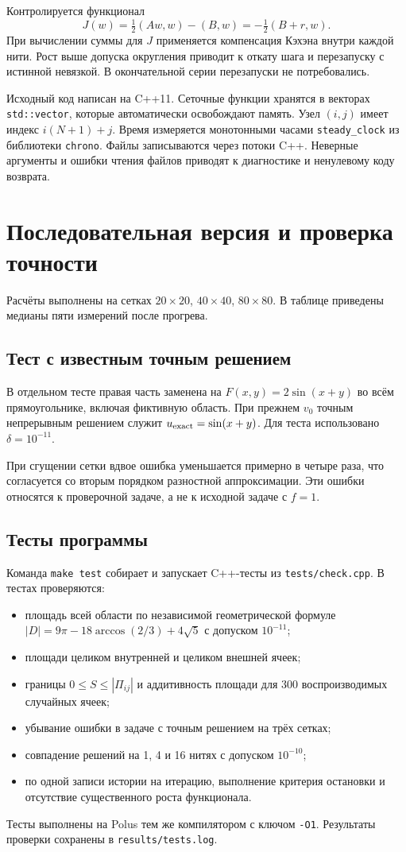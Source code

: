 \documentclass[12pt,a4paper]{article}
\begin{document}
Контролируется функционал
\[
J(w)=\tfrac12(Aw,w)-(B,w)=-\tfrac12(B+r,w).
\]
При вычислении суммы для $J$ применяется компенсация Кэхэна внутри каждой нити. Рост выше допуска округления приводит к откату шага и перезапуску с истинной невязкой. В окончательной серии перезапуски не потребовались.

Исходный код написан на C++11. Сеточные функции хранятся в векторах \texttt{std::vector}, которые автоматически освобождают память. Узел $(i,j)$ имеет индекс $i(N+1)+j$. Время измеряется монотонными часами \texttt{steady\_clock} из библиотеки \texttt{chrono}. Файлы записываются через потоки C++. Неверные аргументы и ошибки чтения файлов приводят к диагностике и ненулевому коду возврата.

\section{Последовательная версия и проверка точности}
Расчёты выполнены на сетках $20\times20$, $40\times40$, $80\times80$. В таблице приведены медианы пяти измерений после прогрева.


\subsection{Тест с известным точным решением}
В отдельном тесте правая часть заменена на $F(x,y)=2\sin(x+y)$ во всём прямоугольнике, включая фиктивную область. При прежнем $v_0$ точным непрерывным решением служит $u_{\rm exact}=\sin(x+y)$. Для теста использовано $\delta=10^{-11}$.

При сгущении сетки вдвое ошибка уменьшается примерно в четыре раза, что согласуется со вторым порядком разностной аппроксимации. Эти ошибки относятся к проверочной задаче, а не к исходной задаче с $f=1$.

\subsection{Тесты программы}
Команда \texttt{make test} собирает и запускает C++-тесты из \texttt{tests/check.cpp}. В тестах проверяются:
\begin{itemize}
\setlength{\itemsep}{0pt}
\item площадь всей области по независимой геометрической формуле
$|D|=9\pi-18\arccos(2/3)+4\sqrt5$ с допуском $10^{-11}$;
\item площади целиком внутренней и целиком внешней ячеек;
\item границы $0\leq S\leq |\Pi_{ij}|$ и аддитивность площади для 300 воспроизводимых случайных ячеек;
\item убывание ошибки в задаче с точным решением на трёх сетках;
\item совпадение решений на 1, 4 и 16 нитях с допуском $10^{-10}$;
\item по одной записи истории на итерацию, выполнение критерия остановки и отсутствие существенного роста функционала.
\end{itemize}
Тесты выполнены на Polus тем же компилятором с ключом \texttt{-O1}. Результаты проверки сохранены в \texttt{results/tests.log}.

\end{document}
